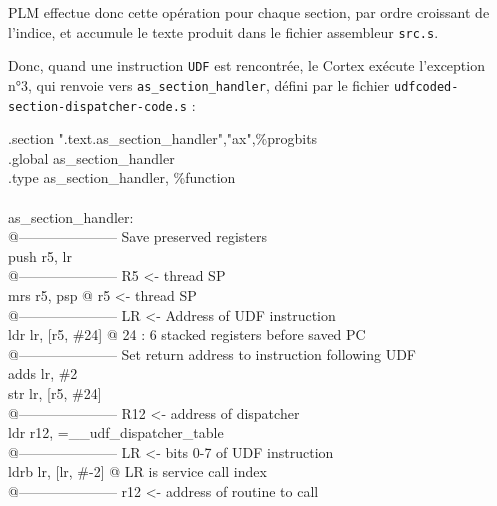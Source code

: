 PLM effectue donc cette opération pour chaque section, par ordre croissant de l'indice, et accumule le texte produit dans le fichier assembleur \texttt{src.s}.

Donc, quand une instruction \texttt{UDF} est rencontrée, le Cortex exécute l'exception n°3, qui renvoie vers \texttt{as\_section\_handler}, défini par le fichier \texttt{udfcoded-section-dispatcher-code.s} :

\begin{SHELL}\small
\hspace*{1.2em}.section	".text.as\_section\_handler","ax",\%progbits\\
\hspace*{1.2em}.global as\_section\_handler\\
\hspace*{1.2em}.type as\_section\_handler, \%function\\
\\
as\_section\_handler:\\
@--------------------- Save preserved registers\\
\hspace*{1.2em}push  {r5, lr}\\
@--------------------- R5 <- thread SP\\
\hspace*{1.2em}mrs   r5, psp           @ r5 <- thread SP\\
@--------------------- LR <- Address of UDF instruction\\
\hspace*{1.2em}ldr   lr, [r5, \#24]     @ 24 : 6 stacked registers before saved PC\\
@--------------------- Set return address to instruction following UDF\\
\hspace*{1.2em}adds  lr, \#2\\
\hspace*{1.2em}str   lr, [r5, \#24]\\
@--------------------- R12 <- address of dispatcher\\
\hspace*{1.2em}ldr   r12, =\_\_udf\_dispatcher\_table\\
@--------------------- LR <- bits 0-7 of UDF instruction\\
\hspace*{1.2em}ldrb  lr, [lr, \#-2]            @ LR is service call index\\
@--------------------- r12 <- address of routine to call\\

\end{SHELL}
